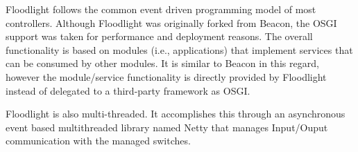 Floodlight follows the common event driven programming model of most  controllers. 
Although Floodlight was originally forked from Beacon, the OSGI support was taken for performance and deployment reasons. 
The overall functionality is based on modules (i.e., applications) that implement services that can be consumed by other modules. 
It is similar to Beacon in this regard, however the module/service functionality is directly provided by Floodlight instead of delegated to a third-party framework as OSGI. 

Floodlight is also multi-threaded. 
It accomplishes this through an asynchronous event based multithreaded library named Netty \cite{netty} that manages Input/Ouput communication with the managed switches. 


